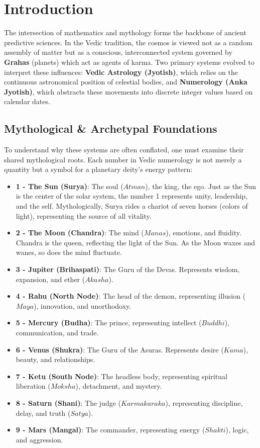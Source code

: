 \documentclass[
  american,
  11pt,
  oneside,
  openany]{article}
\providecommand{\tightlist}{%
  \setlength{\itemsep}{0pt}\setlength{\parskip}{0pt}}
\begin{document}
\section{Introduction}\label{introduction}

The intersection of mathematics and mythology forms the backbone of
ancient predictive sciences. In the Vedic tradition, the cosmos is
viewed not as a random assembly of matter but as a conscious,
interconnected system governed by \textbf{Grahas} (planets) which act as
agents of karma. Two primary systems evolved to interpret these
influences: \textbf{Vedic Astrology (Jyotish)}, which relies on the
continuous astronomical position of celestial bodies, and
\textbf{Numerology (Anka Jyotish)}, which abstracts these movements into
discrete integer values based on calendar dates.

\subsection{Mythological \& Archetypal
Foundations}\label{mythological-archetypal-foundations}

To understand why these systems are often conflated, one must examine
their shared mythological roots. Each number in Vedic numerology is not
merely a quantity but a symbol for a planetary deity's energy pattern:

\begin{itemize}
\tightlist
\item
  \textbf{1 - The Sun (Surya)}: The soul (\(Atman\)), the king, the ego.
  Just as the Sun is the center of the solar system, the number 1
  represents unity, leadership, and the self. Mythologically, Surya
  rides a chariot of seven horses (colors of light), representing the
  source of all vitality.
\item
  \textbf{2 - The Moon (Chandra)}: The mind (\(Manas\)), emotions, and
  fluidity. Chandra is the queen, reflecting the light of the Sun. As
  the Moon waxes and wanes, so does the mind fluctuate.
\item
  \textbf{3 - Jupiter (Brihaspati)}: The Guru of the Devas. Represents
  wisdom, expansion, and ether (\(Akasha\)).
\item
  \textbf{4 - Rahu (North Node)}: The head of the demon, representing
  illusion (\(Maya\)), innovation, and unorthodoxy.
\item
  \textbf{5 - Mercury (Budha)}: The prince, representing intellect
  (\(Buddhi\)), communication, and trade.
\item
  \textbf{6 - Venus (Shukra)}: The Guru of the Asuras. Represents desire
  (\(Kama\)), beauty, and relationships.
\item
  \textbf{7 - Ketu (South Node)}: The headless body, representing
  spiritual liberation (\(Moksha\)), detachment, and mystery.
\item
  \textbf{8 - Saturn (Shani)}: The judge (\(Karmakaraka\)), representing
  discipline, delay, and truth (\(Satya\)).
\item
  \textbf{9 - Mars (Mangal)}: The commander, representing energy
  (\(Shakti\)), logic, and aggression.
\end{itemize}
\end{document}
